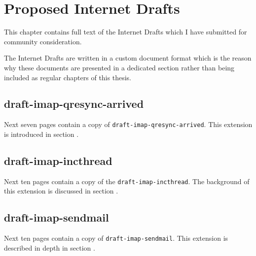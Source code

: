 \documentclass[trojita]{subfiles}
\begin{document}
\chapter{Proposed Internet Drafts}
\label{sec:id-manuscripts}

This chapter contains full text of the Internet Drafts which I have submitted for community consideration.

The Internet Drafts are written in a custom document format which is the reason why these documents are presented in a
dedicated section rather than being included as regular chapters of this thesis.

\section{draft-imap-qresync-arrived}
\label{sec:draft-imap-qresync-arrived}

Next seven pages contain a copy of {\tt draft-imap-qresync-arrived}.  This extension is introduced in section
.



\section{draft-imap-incthread}
\label{sec:draft-imap-incthread}

Next ten pages contain a copy of the {\tt draft-imap-incthread}.  The background of this extension is
discussed in section .



\section{draft-imap-sendmail}
\label{sec:draft-imap-sendmail}

Next ten pages contain a copy of {\tt draft-imap-sendmail}.  This extension is described in depth in section
.


\end{document}

